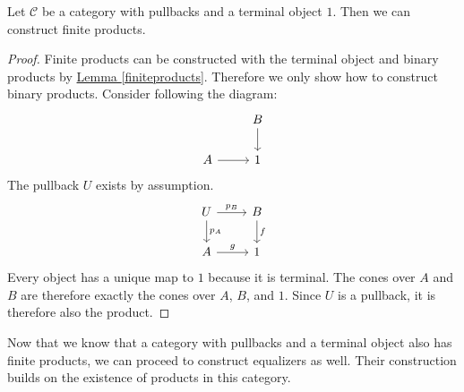 \begin{fact}
  \label{pullbackproduct}
  Let $\mathscr C$ be a category with pullbacks and a terminal object $1$.
  Then we can construct finite products.
\end{fact}
\begin{proof}
Finite products can be constructed
with the terminal object and binary products by
\hyperref[finiteproducts]{Lemma \ref*{finiteproducts}}.
Therefore we only show how to construct binary products.
Consider following the diagram:
\[
  \begin{tikzcd}
    & B \arrow{d} \\
    A \arrow{r} & 1
  \end{tikzcd}
\]
The pullback $U$ exists by assumption.
\[
  \begin{tikzcd}
    U \arrow{r}{p_B} \arrow{d}{p_A} & B \arrow{d}{f} \\
    A \arrow{r}{g} & 1
  \end{tikzcd}
\]
Every object has a unique map to $1$ because it is terminal.
The cones over $A$ and $B$ are therefore exactly the cones
over $A$, $B$, and $1$.
Since $U$ is a pullback, it is therefore also the product.
\end{proof}

Now that we know that a category with pullbacks and a terminal object
also has finite products, we can proceed to construct equalizers as well.
Their construction builds on the existence of products in this category.

